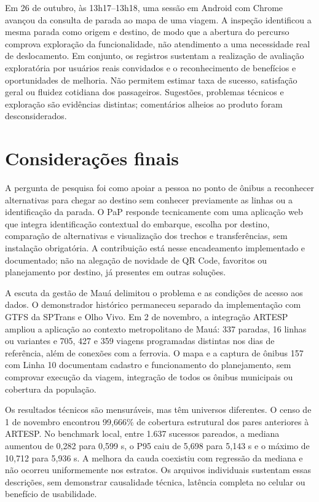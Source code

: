 \documentclass[12pt,oneside,a4paper,brazil,chapter=TITLE]{abntex2}
\begin{document}
Em 26 de outubro, às 13h17--13h18, uma sessão em Android com Chrome avançou da consulta de parada ao mapa de uma viagem. A inspeção identificou a mesma parada como origem e destino, de modo que a abertura do percurso comprova exploração da funcionalidade, não atendimento a uma necessidade real de deslocamento. Em conjunto, os registros sustentam a realização de avaliação exploratória por usuários reais convidados e o reconhecimento de benefícios e oportunidades de melhoria. Não permitem estimar taxa de sucesso, satisfação geral ou fluidez cotidiana dos passageiros. Sugestões, problemas técnicos e exploração são evidências distintas; comentários alheios ao produto foram desconsiderados.







\chapter{Considerações finais}
A pergunta de pesquisa foi como apoiar a pessoa no ponto de ônibus a reconhecer alternativas para chegar ao destino sem conhecer previamente as linhas ou a identificação da parada. O PaP responde tecnicamente com uma aplicação web que integra identificação contextual do embarque, escolha por destino, comparação de alternativas e visualização dos trechos e transferências, sem instalação obrigatória. A contribuição está nesse encadeamento implementado e documentado; não na alegação de novidade de QR Code, favoritos ou planejamento por destino, já presentes em outras soluções.

A escuta da gestão de Mauá delimitou o problema e as condições de acesso aos dados. O demonstrador histórico permaneceu separado da implementação com GTFS da SPTrans e Olho Vivo. Em 2 de novembro, a integração ARTESP ampliou a aplicação ao contexto metropolitano de Mauá: 337 paradas, 16 linhas ou variantes e 705, 427 e 359 viagens programadas distintas nos dias de referência, além de conexões com a ferrovia. O mapa e a captura de ônibus 157 com Linha 10 documentam cadastro e funcionamento do planejamento, sem comprovar execução da viagem, integração de todos os ônibus municipais ou cobertura da população.

Os resultados técnicos são mensuráveis, mas têm universos diferentes. O censo de 1 de novembro encontrou 99,666\% de cobertura estrutural dos pares anteriores à ARTESP. No benchmark local, entre 1.637 sucessos pareados, a mediana aumentou de 0,282 para 0,599 s, o P95 caiu de 5,698 para 5,143 s e o máximo de 10,712 para 5,936 s. A melhora da cauda coexistiu com regressão da mediana e não ocorreu uniformemente nos estratos. Os arquivos individuais sustentam essas descrições, sem demonstrar causalidade técnica, latência completa no celular ou benefício de usabilidade.
\end{document}
